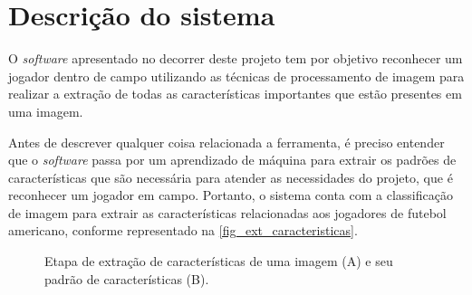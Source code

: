 \section{\textbf{Descrição do sistema}}
\label{descricao-do-sistema}


O \textit{software} apresentado no decorrer deste projeto tem por objetivo reconhecer um jogador dentro de campo utilizando as técnicas de processamento de imagem para realizar a extração de todas as características importantes que estão presentes em uma imagem.

Antes de descrever qualquer coisa relacionada a ferramenta, é preciso entender que o \textit{software} passa por um aprendizado de máquina para extrair os padrões de características que são necessária para atender as necessidades do projeto, que é reconhecer um jogador em campo. Portanto, o sistema conta com a classificação de imagem para extrair as características relacionadas aos jogadores de futebol americano, conforme representado na \autoref{fig_ext_caracteristicas}.

\begin{figure}[h]
	\caption{\label{fig_ext_caracteristicas}Etapa de extração de características de uma imagem (A) e seu padrão de características (B).}
	\begin{center}
	\end{center}
	\centering {}
\end{figure}


